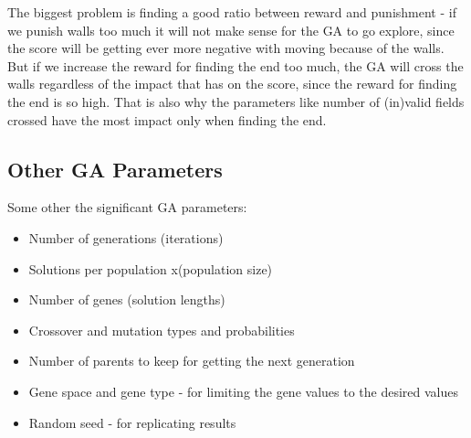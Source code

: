 \documentclass{article}
\begin{document}
The biggest problem is finding a good ratio between reward and punishment - if we punish walls too much it will not make sense for the GA to go explore, since the score will be getting ever more negative with moving because of the walls. But if we increase the reward for finding the end too much, the GA will cross the walls regardless of the impact that has on the score, since the reward for finding the end is so high. That is also why the parameters like number of (in)valid fields crossed have the most impact only when finding the end.

\subsection{Other GA Parameters}
Some other the significant GA parameters:
\begin{itemize}
    \item Number of generations (iterations)
    \item Solutions per population x(population size)
    \item Number of genes (solution lengths)
    \item Crossover and mutation types and probabilities
    \item Number of parents to keep for getting the next generation
    \item Gene space and gene type - for limiting the gene values to the desired values
    \item Random seed - for replicating results
\end{itemize}
\end{document}
